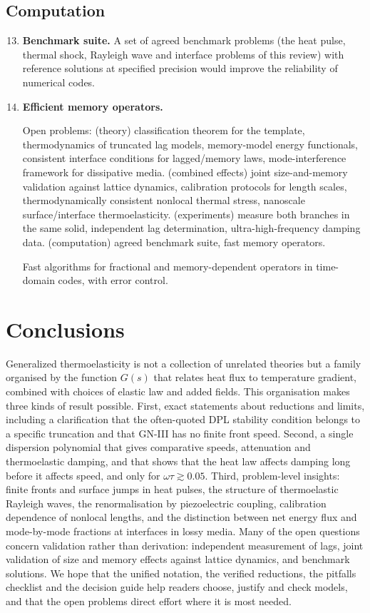 \subsection{Computation}
\begin{enumerate}
\setcounter{enumi}{12}
\item \textbf{Benchmark suite.} A set of agreed benchmark problems (the heat pulse, thermal shock, Rayleigh wave and interface problems of this review) with reference solutions at specified precision would improve the reliability of numerical codes.
\item \textbf{Efficient memory operators.}

\begin{summarybox}[Summary]
Open problems: (theory) classification theorem for the template, thermodynamics of truncated lag models, memory-model energy functionals, consistent interface conditions for lagged/memory laws, mode-interference framework for dissipative media. (combined effects) joint size-and-memory validation against lattice dynamics, calibration protocols for length scales, thermodynamically consistent nonlocal thermal stress, nanoscale surface/interface thermoelasticity. (experiments) measure both branches in the same solid, independent lag determination, ultra-high-frequency damping data. (computation) agreed benchmark suite, fast memory operators.
\end{summarybox} Fast algorithms for fractional and memory-dependent operators in time-domain codes, with error control.
\end{enumerate}

\section{Conclusions}\label{sec:conclusions}
Generalized thermoelasticity is not a collection of unrelated theories but a family organised by the function $G(s)$ that relates heat flux to temperature gradient, combined with choices of elastic law and added fields. This organisation makes three kinds of result possible. First, exact statements about reductions and limits, including a clarification that the often-quoted DPL stability condition belongs to a specific truncation and that GN-III has no finite front speed. Second, a single dispersion polynomial that gives comparative speeds, attenuation and thermoelastic damping, and that shows that the heat law affects damping long before it affects speed, and only for $\omega\tau\gtrsim0.05$. Third, problem-level insights: finite fronts and surface jumps in heat pulses, the structure of thermoelastic Rayleigh waves, the renormalisation by piezoelectric coupling, calibration dependence of nonlocal lengths, and the distinction between net energy flux and mode-by-mode fractions at interfaces in lossy media. Many of the open questions concern validation rather than derivation: independent measurement of lags, joint validation of size and memory effects against lattice dynamics, and benchmark solutions. We hope that the unified notation, the verified reductions, the pitfalls checklist and the decision guide help readers choose, justify and check models, and that the open problems direct effort where it is most needed.
